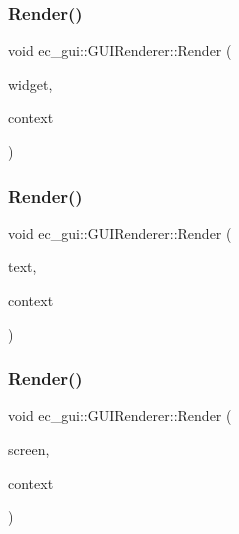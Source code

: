 \subsubsection{\texorpdfstring{Render()}{Render()}\hspace{0.1cm}{\footnotesize\ttfamily [2/5]}}
{\footnotesize\ttfamily void ec\+\_\+gui\+::\+G\+U\+I\+Renderer\+::\+Render (\begin{DoxyParamCaption}\item[{\mbox{\hyperlink{classec__gui_1_1_widget}{Widget}} $\ast$}]{widget,  }\item[{\mbox{\hyperlink{classec__gui_1_1_g_u_i_rendering_context}{G\+U\+I\+Rendering\+Context}} \&}]{context }\end{DoxyParamCaption})}

\mbox{\label{classec__gui_1_1_g_u_i_renderer_a2ad73d19b7af31b597db4ab8cc752b00}} 
\subsubsection{\texorpdfstring{Render()}{Render()}\hspace{0.1cm}{\footnotesize\ttfamily [3/5]}}
{\footnotesize\ttfamily void ec\+\_\+gui\+::\+G\+U\+I\+Renderer\+::\+Render (\begin{DoxyParamCaption}\item[{\mbox{\hyperlink{classec__gui_1_1_text}{Text}} $\ast$}]{text,  }\item[{\mbox{\hyperlink{classec__gui_1_1_g_u_i_rendering_context}{G\+U\+I\+Rendering\+Context}} \&}]{context }\end{DoxyParamCaption})}

\mbox{\label{classec__gui_1_1_g_u_i_renderer_a872a3670396e8eb20858e5e2396889a6}} 
\subsubsection{\texorpdfstring{Render()}{Render()}\hspace{0.1cm}{\footnotesize\ttfamily [4/5]}}
{\footnotesize\ttfamily void ec\+\_\+gui\+::\+G\+U\+I\+Renderer\+::\+Render (\begin{DoxyParamCaption}\item[{\mbox{\hyperlink{classec__gui_1_1_screen}{Screen}} $\ast$}]{screen,  }\item[{\mbox{\hyperlink{classec__gui_1_1_g_u_i_rendering_context}{G\+U\+I\+Rendering\+Context}} \&}]{context }\end{DoxyParamCaption})}

